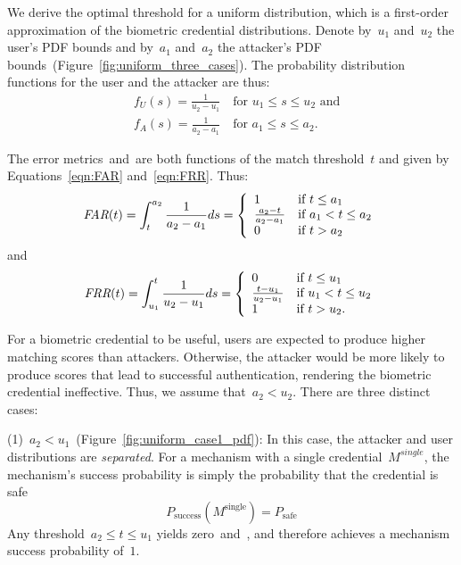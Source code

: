 \documentclass[conference,compsoc]{IEEEtran}
\begin{document}
We derive the optimal threshold for a uniform distribution, which is a first-order approximation of the biometric credential distributions.
Denote by~$u_1$ and~$u_2$ the user's PDF bounds and by~$a_1$ and~$a_2$ the attacker's PDF bounds~(Figure~\ref{fig:uniform_three_cases}). The probability distribution functions for the user and the attacker are thus:
\begin{align*}
&f_U(s) = \frac{1}{u_2-u_1} \quad \text{for } u_1 \leq s \leq u_2 \text{ and}\\
&f_A(s) = \frac{1}{a_2-a_1} \quad \text{for } a_1 \leq s \leq a_2.
\end{align*}

The error metrics~\FAR and~\FRR are both functions of the match threshold~$t$ and given by Equations~\ref{eqn:FAR} and~\ref{eqn:FRR}. Thus:
\[
\textit{FAR}(t) = \int_{t}^{a_2} \frac{1}{a_2-a_1} ds =
\left\{
\begin{array}{ll}
1 & \text{if } t \le a_1 \\
\frac{a_2 - t}{a_2 - a_1} & \text{if } a_1 < t \le a_2 \\
0 & \text{if } t > a_2
\end{array}
\right.
\]
and
\[
\textit{FRR}(t) = \int_{u_1}^{t} \frac{1}{u_2-u_1} ds =
\left\{
\begin{array}{ll}
0 & \text{if } t \le u_1 \\
\frac{t - u_1}{u_2 - u_1} & \text{if } u_1 < t \le u_2 \\
1 & \text{if } t > u_2.
\end{array}
\right.
\]

For a biometric credential to be useful, users are expected to produce higher matching scores than attackers. Otherwise, the attacker would be more likely to produce scores that lead to successful authentication, rendering the biometric credential ineffective. Thus, we assume that~${a_2 < u_2}$. There are three distinct cases:

(1)~$a_2 < u_1$~(Figure~\ref{fig:uniform_case1_pdf}): In this case, the attacker and user distributions are \emph{separated}. For a mechanism with a single credential~$M^{\textit{single}}$, the mechanism's success probability is simply the probability that the credential is safe
\begin{equation}
    \label{eqn:safesuccess}
    P_{\text{success}}(M^{\text{single}}) = P_{{\text{safe}}}
\end{equation}
Any threshold~$a_2 \le t \le u_1$ yields zero~\FAR and~\FRR, and therefore achieves a mechanism success probability of~$1$.
\end{document}
